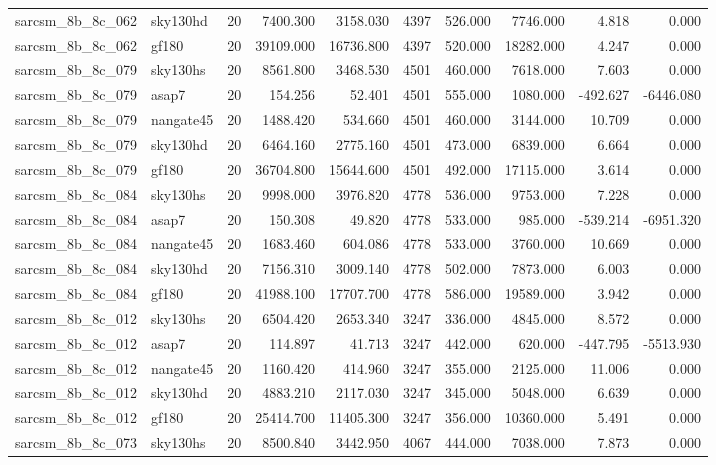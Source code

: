 \begin{tabular}{llrrrrrrrr}
sarcsm\_8b\_8c\_062 & sky130hd & 20 & 7400.300 & 3158.030 & 4397 & 526.000 & 7746.000 & 4.818 & 0.000 \\
sarcsm\_8b\_8c\_062 & gf180 & 20 & 39109.000 & 16736.800 & 4397 & 520.000 & 18282.000 & 4.247 & 0.000 \\
sarcsm\_8b\_8c\_079 & sky130hs & 20 & 8561.800 & 3468.530 & 4501 & 460.000 & 7618.000 & 7.603 & 0.000 \\
sarcsm\_8b\_8c\_079 & asap7 & 20 & 154.256 & 52.401 & 4501 & 555.000 & 1080.000 & -492.627 & -6446.080 \\
sarcsm\_8b\_8c\_079 & nangate45 & 20 & 1488.420 & 534.660 & 4501 & 460.000 & 3144.000 & 10.709 & 0.000 \\
sarcsm\_8b\_8c\_079 & sky130hd & 20 & 6464.160 & 2775.160 & 4501 & 473.000 & 6839.000 & 6.664 & 0.000 \\
sarcsm\_8b\_8c\_079 & gf180 & 20 & 36704.800 & 15644.600 & 4501 & 492.000 & 17115.000 & 3.614 & 0.000 \\
sarcsm\_8b\_8c\_084 & sky130hs & 20 & 9998.000 & 3976.820 & 4778 & 536.000 & 9753.000 & 7.228 & 0.000 \\
sarcsm\_8b\_8c\_084 & asap7 & 20 & 150.308 & 49.820 & 4778 & 533.000 & 985.000 & -539.214 & -6951.320 \\
sarcsm\_8b\_8c\_084 & nangate45 & 20 & 1683.460 & 604.086 & 4778 & 533.000 & 3760.000 & 10.669 & 0.000 \\
sarcsm\_8b\_8c\_084 & sky130hd & 20 & 7156.310 & 3009.140 & 4778 & 502.000 & 7873.000 & 6.003 & 0.000 \\
sarcsm\_8b\_8c\_084 & gf180 & 20 & 41988.100 & 17707.700 & 4778 & 586.000 & 19589.000 & 3.942 & 0.000 \\
sarcsm\_8b\_8c\_012 & sky130hs & 20 & 6504.420 & 2653.340 & 3247 & 336.000 & 4845.000 & 8.572 & 0.000 \\
sarcsm\_8b\_8c\_012 & asap7 & 20 & 114.897 & 41.713 & 3247 & 442.000 & 620.000 & -447.795 & -5513.930 \\
sarcsm\_8b\_8c\_012 & nangate45 & 20 & 1160.420 & 414.960 & 3247 & 355.000 & 2125.000 & 11.006 & 0.000 \\
sarcsm\_8b\_8c\_012 & sky130hd & 20 & 4883.210 & 2117.030 & 3247 & 345.000 & 5048.000 & 6.639 & 0.000 \\
sarcsm\_8b\_8c\_012 & gf180 & 20 & 25414.700 & 11405.300 & 3247 & 356.000 & 10360.000 & 5.491 & 0.000 \\
sarcsm\_8b\_8c\_073 & sky130hs & 20 & 8500.840 & 3442.950 & 4067 & 444.000 & 7038.000 & 7.873 & 0.000 \\

\end{tabular}
